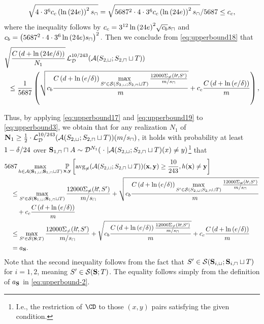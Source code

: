 \begin{proofof}{}
\begin{align}
    \sqrt{4\cdot3^{6}c_c \left(\ln{\left(24e \right)}\right)^{2}s_{\cap}}= \sqrt{5687^2\cdot4\cdot3^{6}c_c \left(\ln{\left(24e \right)}\right)^{2}s_{\cap}}/5687
    \leq
    c_c ,
\end{align}
where the inequality follows by $c_c=  3^{12}  \ln{(24e )}^{2}\sqrt{c_b} s_{\sqcap}
    $ and $c_b=\left(5687^2\cdot4\cdot3^{6} \ln{(24e)}s_{\sqcap}\right)^{2}.$ 
Then we conclude from \cref{eq:upperbound18} that 
    \begin{align}\label{eq:upperbound19}
        &\sqrt{\frac{C\left(d+\ln{(24e/\delta )}\right)}{N_1}} \operatorname{\mathcal{L}}_{\mathcal{D}}^{10/243}(\mathcal{A}(S_{2,\sqcup};S_{2,\sqcap}\sqcup T))
        \\
        &\; \; \leq
       \frac{1}{5687}\left(\sqrt{c_b\frac{C\left(d+\ln{(e/\delta )}\right) \max\limits_{S'\in\mathcal{S}(S_{2,\sqcup};S_{2,\sqcap}\sqcup T)}\frac{12000\Sigma_{\not=}(h^{\negmedspace\star}\negmedspace,S')}{m/ s_{\sqcap}} }{m}} \nonumber
 + 
        c_c\frac{C\left(d+\ln{(e/\delta )}\right) }{m}\right),
    \end{align}

Thus, by applying \cref{eq:upperbound17} and \cref{eq:upperbound19} to \cref{eq:upperbound3}, we obtain that for any realization $ N_{1} $ of $ \mathbf{N}_1\geq \frac 12 \cdot \operatorname{\mathcal{L}}_{\mathcal{D}}^{10/243}(\mathcal{A}(S_{2,\sqcup};S_{2,\sqcap}\sqcup T))(m/s_{\sqcap})$, it holds with probability at least $1-\delta/24 $ over $ \mathbf{S}_{1,\sqcap}\sqcap A \sim \mathcal{D}^{N_{1}}(\; \cdot \;| \mathcal{A}(S_{2,\sqcup};S_{2,\sqcap}\sqcup T)(x)\not=y)$\footnote{I.e., the restriction of $\CD$ to those $(x, y)$ pairs satisfying the given condition.} that
\begin{align}\label{eq:upperbound15}
&5687\max_{h\in \erm(\rS_{1,\sqcup};\rS_{1,\sqcap}\sqcup T)}\p_{\rx,\ry} \left[ \avg(\erm(S_{2,\sqcup};S_{2,\sqcap}\sqcup T))(\rx,\ry)\geq \frac{10}{243}, h(\rx)\not=\ry \right] 
\\
& \quad \leq \max\limits_{S'\in \cS(\rS_{1,\sqcup};\rS_{1,\sqcap}\sqcup T)}\frac{12000\Sigma_{\not=}(\hs\negmedspace,S')}{m/s_{\sqcap}} +\sqrt{\cb\frac{C\left(d+\ln{(e/\delta )}\right) \max\limits_{S'\in\cS(S_{2,\sqcup};S_{2,\sqcap}\sqcup T)}\frac{12000\Sigma_{\not=}(\hs\negmedspace,S')}{m/ s_{\sqcap}} }{m}} \nonumber \\
& \qquad + \cc\frac{C\left(d+\ln{(e/\delta )}\right) }{m} \nonumber \\
& \quad \leq \max\limits_{S'\in \cS(\rS; T)}\frac{12000\Sigma_{\not=}(\hs\negmedspace,S')}{m/s_{\sqcap}} +\sqrt{\cb\frac{C\left(d+\ln{(e/\delta )}\right) \frac{12000\Sigma_{\not=}(\hs\negmedspace,S')}{m/ s_{\sqcap}} }{m}} \nonumber
+ \cc\frac{C\left(d+\ln{(e/\delta )}\right) }{m} \nonumber \\
&\quad =a_{\rS}.
\end{align} 
Note that the second inequality follows from the fact that $ S'\in \mathcal{S}(\mathbf{S}_{i,\sqcup};\mathbf{S}_{i,\sqcap}\sqcup T) $ for $ i=1,2 $, meaning $ S'\in \mathcal{S}(\mathbf{S};T)$. The equality follows simply from the definition of $ a_{\mathbf{S}}$ in \cref{eq:upperbound-2}.  


\end{proofof}
